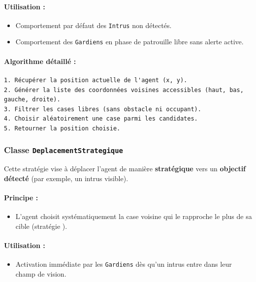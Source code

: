 \paragraph{Utilisation :}
\begin{itemize}
    \item Comportement par défaut des \texttt{Intrus} non détectés.
    \item Comportement des \texttt{Gardiens} en phase de patrouille libre sans alerte active.
\end{itemize}


\paragraph{Algorithme détaillé :}
\begin{verbatim}
1. Récupérer la position actuelle de l'agent (x, y).
2. Générer la liste des coordonnées voisines accessibles (haut, bas, gauche, droite).
3. Filtrer les cases libres (sans obstacle ni occupant).
4. Choisir aléatoirement une case parmi les candidates.
5. Retourner la position choisie.
\end{verbatim}



\subsubsection{ Classe \texttt{DeplacementStrategique}}

Cette stratégie vise à déplacer l'agent de manière \textbf{stratégique} vers un \textbf{objectif détecté} (par exemple, un intrus visible).

\paragraph{Principe :}
\begin{itemize}
    \item L’agent choisit systématiquement la case voisine qui le rapproche le plus de sa cible (stratégie ).
    
\end{itemize}

\paragraph{Utilisation :}
\begin{itemize}
    \item Activation immédiate par les \texttt{Gardiens} dès qu’un intrus entre dans leur champ de vision.
\end{itemize}

